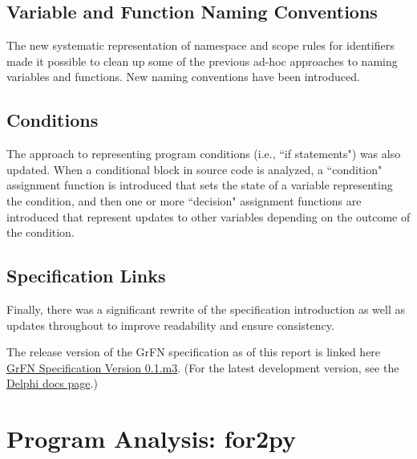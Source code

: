 \documentclass[article, 12pt, oneside]{memoir}
\begin{document}
\hypertarget{variable-and-function-naming-conventions}{%
\subsection{Variable and Function Naming
Conventions}\label{variable-and-function-naming-conventions}}

The new systematic representation of namespace and scope rules for
identifiers made it possible to clean up some of the previous ad-hoc
approaches to naming variables and functions. New naming conventions
have been introduced.

\hypertarget{conditions}{%
\subsection{Conditions}\label{conditions}}

The approach to representing program conditions (i.e., ``if statements")
was also updated. When a conditional block in source
code is analyzed, a ``condition" assignment function is introduced that sets the
state of a variable representing the condition, and then one or more
``decision" assignment functions are introduced that represent updates to
other variables depending on the outcome of the condition.

\hypertarget{specification-links}{%
\subsection{Specification Links}\label{specification-links}}

Finally, there was a significant rewrite of the specification
introduction as well as updates throughout to improve readability and
ensure consistency.

The release version of the GrFN specification as of this report is
linked here \href{GrFN_specification_v0.1.m3}{GrFN Specification Version
0.1.m3}. (For the latest development version, see the
\href{https://ml4ai.github.io/delphi/grfn_spec.html}{Delphi
docs page}.)


\hypertarget{program-analysis-for2py}{%
\section{Program Analysis: for2py}\label{program-analysis-for2py}}
\end{document}
